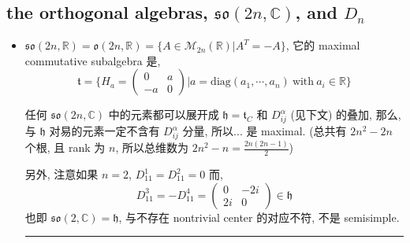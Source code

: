 \subsection{the orthogonal algebras, \texorpdfstring{$\mathfrak{so}(2 n, \mathbb{C})$}{so(2 n, C)}, and \texorpdfstring{$D_n$}{D\_n}}
\begin{itemize}
	\item $\mathfrak{so}(2 n, \mathbb{R}) = \mathfrak{o}(2 n, \mathbb{R}) = \{A \in \mathcal{M}_{2 n}(\mathbb{R}) | A^T = - A\}$, 它的 maximal commutative subalgebra 是,
	\begin{equation}
		\mathfrak{t} = \{H_a = \begin{pmatrix}
			0 & a \\
			- a & 0
		\end{pmatrix} | a = \mathrm{diag}(a_1, \cdots, a_n) \ \text{with} \ a_i \in \mathbb{R}\}
	\end{equation}
	
	\begin{tcolorbox}[title=proof:]
		任何 $\mathfrak{so}(2 n, \mathbb{C})$ 中的元素都可以展开成 $\mathfrak{h} = \mathfrak{t}_C$ 和 $D^\alpha_{i j}$ (见下文) 的叠加, 那么, 与 $\mathfrak{h}$ 对易的元素一定不含有 $D^\alpha_{i j}$ 分量, 所以... 是 maximal. (总共有 $2 n^2 - 2 n$ 个根, 且 rank 为 $n$, 所以总维数为 $2 n^2 - n = \frac{2 n (2 n - 1)}{2}$)
		
		另外, 注意如果 $n = 2$, $D^1_{1 1} = D^2_{1 1} = 0$ 而,
		\begin{equation}
			D^3_{1 1} = - D^4_{1 1} = \begin{pmatrix}
				0 & - 2 i \\
				2 i & 0
			\end{pmatrix} \in \mathfrak{h}
		\end{equation}
		也即 $\mathfrak{so}(2, \mathbb{C}) = \mathfrak{h}$, 与不存在 nontrivial center 的对应不符, 不是 semisimple.
	\end{tcolorbox}
	
	\noindent\rule[0.5ex]{\linewidth}{0.5pt} %
	

\end{itemize}
